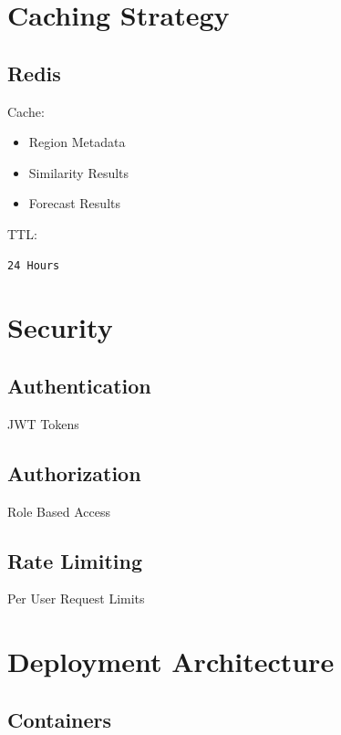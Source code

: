 \documentclass[11pt,a4paper]{article}
\begin{document}
\section{Caching Strategy}

\subsection{Redis}

Cache:

\begin{itemize}
\item Region Metadata
\item Similarity Results
\item Forecast Results
\end{itemize}

TTL:

\begin{verbatim}
24 Hours
\end{verbatim}

\section{Security}

\subsection{Authentication}

JWT Tokens

\subsection{Authorization}

Role Based Access

\subsection{Rate Limiting}

Per User Request Limits

\section{Deployment Architecture}

\subsection{Containers}
\end{document}
